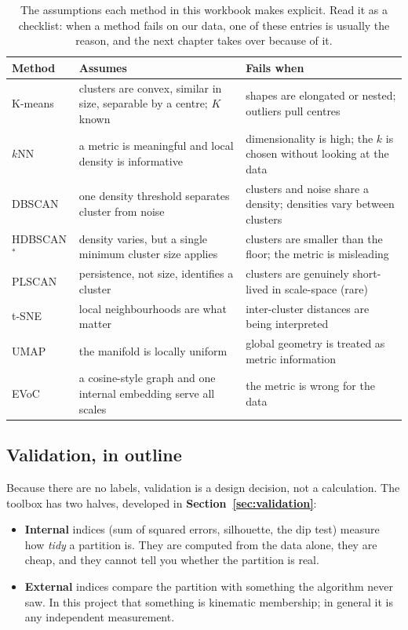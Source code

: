 \begin{table}[htbp]
\caption{The assumptions each method in this workbook makes explicit. Read it
as a checklist: when a method fails on our data, one of these entries is
usually the reason, and the next chapter takes over because of it.}
\label{tab:assumptions}
\begin{center}
\begin{tabular}{@{}p{4.6pc}p{8.2pc}p{9.6pc}@{}}
\hline
Method & Assumes & Fails when\\
\hline
K-means & clusters are convex, similar in size, separable by a centre;
  $K$ known & shapes are elongated or nested; outliers pull centres\\
$k$NN & a metric is meaningful and local density is informative &
  dimensionality is high; the $k$ is chosen without looking at the data\\
DBSCAN & one density threshold separates cluster from noise &
  clusters and noise share a density; densities vary between clusters\\
HDBSCAN$^*$ & density varies, but a single minimum cluster size applies &
  clusters are smaller than the floor; the metric is misleading\\
PLSCAN & persistence, not size, identifies a cluster &
  clusters are genuinely short-lived in scale-space (rare)\\
t-SNE & local neighbourhoods are what matter &
  inter-cluster distances are being interpreted\\
UMAP & the manifold is locally uniform &
  global geometry is treated as metric information\\
EVoC & a cosine-style graph and one internal embedding serve all scales &
  the metric is wrong for the data\\
\hline
\end{tabular}
\end{center}
\end{table}

\subsection{Validation, in outline}

Because there are no labels, validation is a design decision, not a
calculation. The toolbox has two halves, developed in
\textbf{Section~\ref{sec:validation}}:

\begin{itemize}
\item \textbf{Internal} indices (sum of squared errors, silhouette, the dip
test) measure how \emph{tidy} a partition is. They are computed from the data
alone, they are cheap, and they cannot tell you whether the partition is real.
\item \textbf{External} indices compare the partition with something the
  algorithm never saw. In this project that something is kinematic membership;
  in general it is any independent measurement.
\end{itemize}

